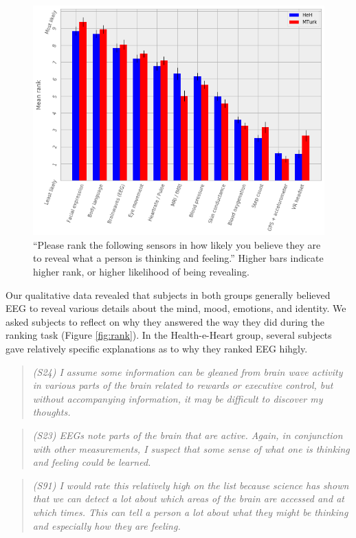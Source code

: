 \documentclass[sigconf]{acmart}
\begin{document}
\label{fig:rank}
\begin{figure}
\centering
\includegraphics[width=.9\linewidth]{./figures/rankings.png}
\caption{``Please rank the following sensors in how likely you believe they are to reveal what a person is thinking and feeling.'' Higher bars indicate higher rank, or higher likelihood of being revealing.}
\end{figure}

Our qualitative data revealed that subjects in both groups generally believed EEG to reveal various details about the mind, mood, emotions, and identity.
We asked subjects to reflect on why they answered the way they did during the ranking task (Figure \ref{fig:rank}).
In the Health-e-Heart group, several subjects gave relatively specific explanations as to why they ranked EEG hihgly.

\begin{quote}
\emph{(S24) I assume some information can be gleaned from brain wave activity in various parts of the brain related to rewards or executive control, but without accompanying information, it may be difficult to discover my thoughts.}
\end{quote}

\begin{quote}
\emph{(S23) EEGs note parts of the brain that are active.  Again, in conjunction with other measurements, I suspect that some sense of what one is thinking and feeling could be learned.}
\end{quote}

\begin{quote}
\emph{(S91) I would rate this relatively high on the list because science has shown that we can detect a lot about which areas of the brain are accessed and at which times.  This can tell a person a lot about what they might be thinking and especially how they are feeling.}
\end{quote}
\end{document}
